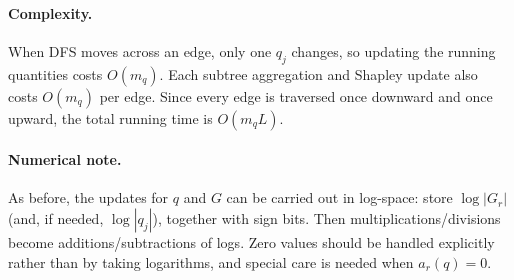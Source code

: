 \paragraph{Complexity.}
When DFS moves across an edge, only one $q_j$ changes, so updating the running quantities costs $O(m_q)$.
Each subtree aggregation and Shapley update also costs $O(m_q)$ per edge.
Since every edge is traversed once downward and once upward, the total running time is $O(m_qL)$.

\paragraph{Numerical note.}
As before, the updates for $q$ and $G$ can be carried out in log-space:
store $\log |G_r|$ (and, if needed, $\log |q_j|$), together with sign bits.
Then multiplications/divisions become additions/subtractions of logs.
Zero values should be handled explicitly rather than by taking logarithms, and special care is needed when $a_r(q)=0$.



